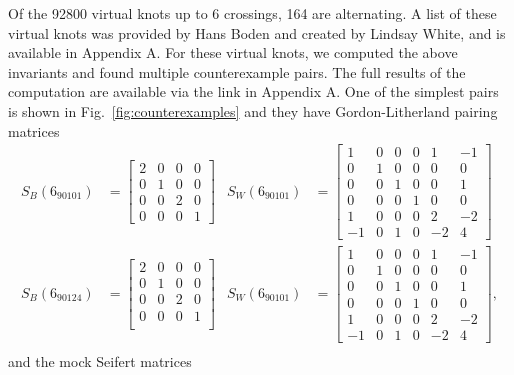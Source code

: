 \documentclass[12pt]{report}
\theoremstyle{upright}
\begin{document}
Of the 92800 virtual knots up to 6 crossings, 164 are alternating. A list of these virtual knots was provided by Hans Boden and created by Lindsay White, and is available in Appendix A. For these virtual knots, we computed the above invariants and found multiple counterexample pairs. The full results of the computation are available via the link in Appendix A. One of the simplest pairs is shown in Fig.~\ref{fig:counterexamples} and they have Gordon-Litherland pairing matrices 
\begin{align*}
	S_{B}(6_{90101}) &= \begin{bmatrix}
		2 & 0 & 0 & 0 \\
		0 & 1 & 0 & 0 \\
		0 & 0 & 2 & 0 \\
		0 & 0 & 0 & 1
	\end{bmatrix}& S_{W}(6_{90101}) &=
\begin{bmatrix}
	1  & 0 & 0 & 0 & 1  & -1 \\
	0  & 1 & 0 & 0 & 0  & 0  \\
	0  & 0 & 1 & 0 & 0  & 1  \\
	0  & 0 & 0 & 1 & 0  & 0  \\
	1  & 0 & 0 & 0 & 2  & -2 \\
	-1 & 0 & 1 & 0 & -2 & 4
\end{bmatrix}\\
	S_{B}(6_{90124}) &= \begin{bmatrix}
		2 & 0 & 0 & 0\\
		0 & 1 & 0 & 0\\
		0 & 0 & 2 & 0\\
		0 & 0 & 0 & 1\\
	\end{bmatrix}
&S_{W}(6_{90101}) &=
\begin{bmatrix}
	1  & 0 & 0 & 0 & 1  & -1 \\
	0  & 1 & 0 & 0 & 0  & 0  \\
	0  & 0 & 1 & 0 & 0  & 1  \\
	0  & 0 & 0 & 1 & 0  & 0  \\
	1  & 0 & 0 & 0 & 2  & -2 \\
	-1 & 0 & 1 & 0 & -2 & 4
\end{bmatrix},\\
\end{align*}
and the mock Seifert matrices
\end{document}
